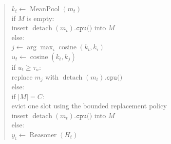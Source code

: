 \begin{quote}
\qquad \(k_t \leftarrow \operatorname{MeanPool}(m_t)\)\\
\qquad if \(M\) is empty:\\
\qquad\quad insert \(\operatorname{detach}(m_t).\texttt{cpu()}\) into \(M\)\\
\qquad else:\\
\qquad\quad \(j \leftarrow \arg\max_i \operatorname{cosine}(k_t, k_i)\)\\
\qquad\quad \(u_t \leftarrow \operatorname{cosine}(k_t, k_j)\)\\
\qquad\quad if \(u_t \geq \tau_u\):\\
\qquad\qquad replace \(m_j\) with \(\operatorname{detach}(m_t).\texttt{cpu()}\)\\
\qquad\quad else:\\
\qquad\qquad if \(|M| = C\):\\
\qquad\qquad\quad evict one slot using the bounded replacement policy\\
\qquad\qquad insert \(\operatorname{detach}(m_t).\texttt{cpu()}\) into \(M\)\\
\quad else:\\
\qquad \(y_t \leftarrow \operatorname{Reasoner}(H_t)\)
\end{quote}
